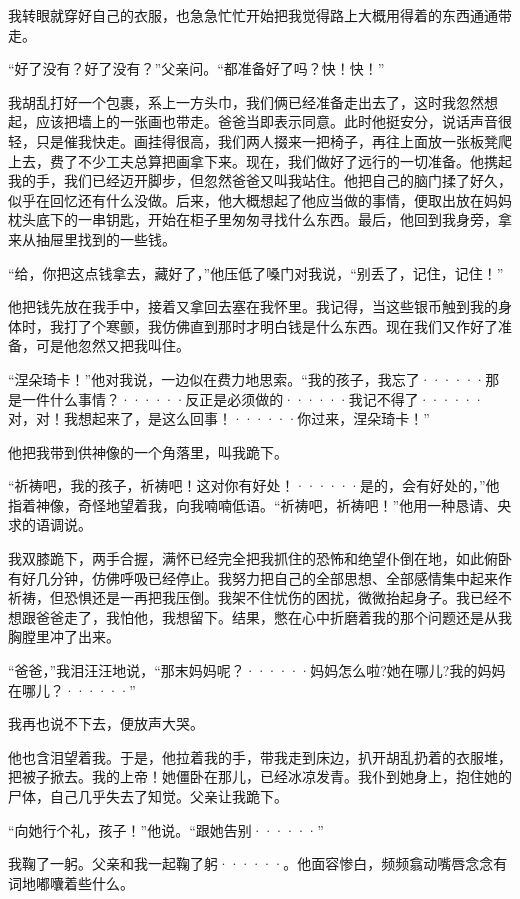 \documentclass[12pt, UTF8]{ctexbook}
\begin{document}
\par 我转眼就穿好自己的衣服，也急急忙忙开始把我觉得路上大概用得着的东西通通带走。
\par “好了没有？好了没有？”父亲问。“都准备好了吗？快！快！”
\par 我胡乱打好一个包裹，系上一方头巾，我们俩已经准备走出去了，这时我忽然想起，应该把墙上的一张画也带走。爸爸当即表示同意。此时他挺安分，说话声音很轻，只是催我快走。画挂得很高，我们两人掇来一把椅子，再往上面放一张板凳爬上去，费了不少工夫总算把画拿下来。现在，我们做好了远行的一切准备。他携起我的手，我们已经迈开脚步，但忽然爸爸又叫我站住。他把自己的脑门揉了好久，似乎在回忆还有什么没做。后来，他大概想起了他应当做的事情，便取出放在妈妈枕头底下的一串钥匙，开始在柜子里匆匆寻找什么东西。最后，他回到我身旁，拿来从抽屉里找到的一些钱。
\par “给，你把这点钱拿去，藏好了，”他压低了嗓门对我说，“别丢了，记住，记住！”
\par 他把钱先放在我手中，接着又拿回去塞在我怀里。我记得，当这些银币触到我的身体时，我打了个寒颤，我仿佛直到那时才明白钱是什么东西。现在我们又作好了准备，可是他忽然又把我叫住。
\par “涅朵琦卡！”他对我说，一边似在费力地思索。“我的孩子，我忘了······那是一件什么事情？······反正是必须做的······我记不得了······对，对！我想起来了，是这么回事！······你过来，涅朵琦卡！”
\par 他把我带到供神像的一个角落里，叫我跪下。
\par “祈祷吧，我的孩子，祈祷吧！这对你有好处！······是的，会有好处的，”他指着神像，奇怪地望着我，向我喃喃低语。“祈祷吧，祈祷吧！”他用一种恳请、央求的语调说。
\par 我双膝跪下，两手合握，满怀已经完全把我抓住的恐怖和绝望仆倒在地，如此俯卧有好几分钟，仿佛呼吸已经停止。我努力把自己的全部思想、全部感情集中起来作祈祷，但恐惧还是一再把我压倒。我架不住忧伤的困扰，微微抬起身子。我已经不想跟爸爸走了，我怕他，我想留下。结果，憋在心中折磨着我的那个问题还是从我胸膛里冲了出来。
\par “爸爸，”我泪汪汪地说，“那末妈妈呢？······妈妈怎么啦?她在哪儿?我的妈妈在哪儿？······”
\par 我再也说不下去，便放声大哭。
\par 他也含泪望着我。于是，他拉着我的手，带我走到床边，扒开胡乱扔着的衣服堆，把被子掀去。我的上帝！她僵卧在那儿，已经冰凉发青。我仆到她身上，抱住她的尸体，自己几乎失去了知觉。父亲让我跪下。
\par “向她行个礼，孩子！”他说。“跟她告别······”
\par 我鞠了一躬。父亲和我一起鞠了躬······。他面容惨白，频频翕动嘴唇念念有词地嘟囔着些什么。
\end{document}
